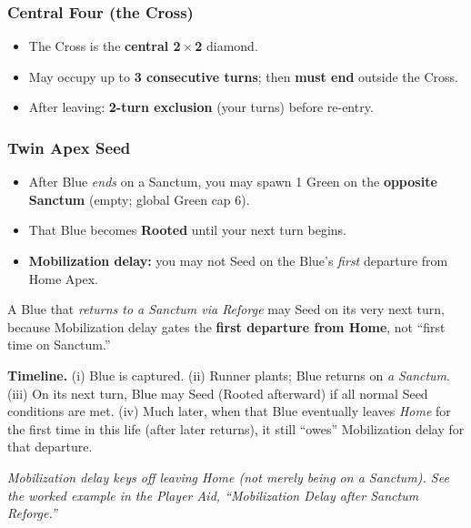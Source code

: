 \documentclass[11pt]{article}
\begin{document}
\begin{multicols}{2}
\subsubsection*{Central Four (the Cross)}
\begin{itemize}[leftmargin=1.1em,itemsep=0.2em]
  \item The Cross is the \textbf{central 2\,$\times$\,2} diamond.
  \item May occupy up to \textbf{3 consecutive turns}; then \textbf{must end} outside the Cross.
  \item After leaving: \textbf{2-turn exclusion} (your turns) before re-entry.
\end{itemize}

\columnbreak

\subsubsection*{Twin Apex Seed}
\begin{itemize}[leftmargin=1.1em,itemsep=0.2em]
  \item After Blue \emph{ends} on a Sanctum, you may spawn 1 Green on the \textbf{opposite Sanctum} (empty; global Green cap 6).
  \item That Blue becomes \textbf{Rooted} until your next turn begins.
  \item \textbf{Mobilization delay:} you may not Seed on the Blue’s \emph{first} departure from Home Apex.
\end{itemize}

\begin{tcolorbox}[enhanced,breakable,title={Worked Example — Mobilization Delay after Sanctum Reforge},
  colback=white,colframe=royal,boxrule=0.8pt]
\small
A Blue that \emph{returns to a Sanctum via Reforge} may Seed on its very next turn, because Mobilization delay gates the \textbf{first departure from Home}, not “first time on Sanctum.”

\textbf{Timeline.} (i) Blue is captured. (ii) Runner plants; Blue returns on \emph{a Sanctum}. (iii) On its next turn, Blue may Seed (Rooted afterward) if all normal Seed conditions are met. (iv) Much later, when that Blue eventually leaves \emph{Home} for the first time in this life (after later returns), it still “owes” Mobilization delay for that departure.
\end{tcolorbox}

\noindent\textit{Mobilization delay keys off leaving Home (not merely being on a Sanctum). See the worked example in the Player Aid, “Mobilization Delay after Sanctum Reforge.”}


\end{multicols}
\end{document}
